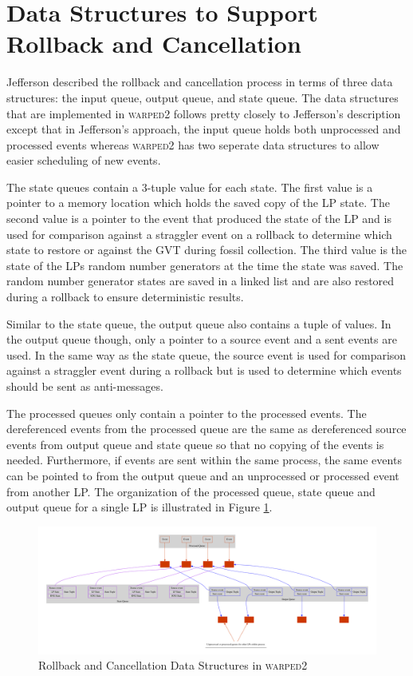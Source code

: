 \documentclass[11pt]{book}
\begin{document}
\section[Rollback \& Cancellation]{Data Structures to Support Rollback and Cancellation}

Jefferson\cite{jefferson-85} described the rollback and cancellation process in terms of three
data structures: the input queue, output queue, and state queue.  The data structures that are
implemented in \textsc{warped2} follows pretty closely to Jefferson's description except that
in Jefferson's approach, the input queue holds both unprocessed and processed events whereas
\textsc{warped2} has two seperate data structures to allow easier scheduling of new events.

The state queues contain a 3-tuple value for each state.  The first value is a pointer to a
memory location which holds the saved copy of the LP state.  The second value is a pointer to the
event that produced the state of the LP and is used for comparison against a straggler event
on a rollback to determine which state to restore or against the GVT during fossil collection.
The third value is the state of the LPs random number generators at the time the state was saved.
The random number generator states are saved in a linked list and are also restored during a
rollback to ensure deterministic results.

Similar to the state queue, the output queue also contains a tuple of values.  In the output
queue though, only a pointer to a source event and a sent events are used.  In the same way
as the state queue, the source event is used for comparison against a straggler event during
a rollback but is used to determine which events should be sent as anti-messages.

The processed queues only contain a pointer to the processed events.  The dereferenced events
from the processed queue are the same as dereferenced source events from output queue and state
queue so that no copying of the events is needed.  Furthermore, if events are sent within the
same process, the same events can be pointed to from the output queue and an unprocessed or
processed event from another LP.  The organization of the processed queue, state queue and output
queue for a single LP is illustrated in Figure \ref{rollback_ds}.

\begin{figure}
    \centering
    \includegraphics[width=\textwidth,quiet]{figs/graphviz/rollback_ds.pdf}
    \caption{Rollback and Cancellation Data Structures in \textsc{warped2}}\label{rollback_ds}
\end{figure}
\end{document}
